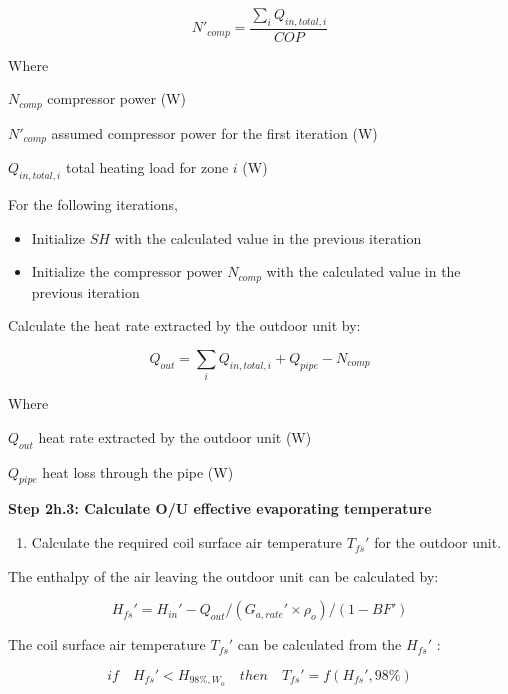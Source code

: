 \begin{equation}
N'_{comp} = \frac{\sum_iQ_{in,total,i}}{COP}
\end{equation}

Where

\(N_{comp}\) compressor power (W)

\(N'_{comp}\) assumed compressor power for the first iteration (W)

\(Q_{in,total,i}\) total heating load for zone \(i\) (W)

For the following iterations,

\begin{itemize}
\item
  Initialize \(SH\) with the calculated value in the previous iteration
\item
  Initialize the compressor power \(N_{comp}\) with the calculated value in the previous iteration
\end{itemize}

Calculate the heat rate extracted by the outdoor unit by:

\begin{equation}
Q_{out} = \sum_iQ_{in,total,i}+Q_{pipe}-N_{comp}
\end{equation}

Where

\(Q_{out}\) heat rate extracted by the outdoor unit (W)

\(Q_{pipe}\) heat loss through the pipe (W)

\textbf{Step 2h.3: Calculate O/U effective evaporating temperature} 

\begin{enumerate}
\def\labelenumi{(\arabic{enumi})}
\tightlist
\item
  Calculate the required coil surface air temperature \({T_{fs}}'\) for the outdoor unit.
\end{enumerate}

The enthalpy of the air leaving the outdoor unit can be calculated by:

\begin{equation}
{H_{fs}}' = {H_{in}}'-Q_{out}/({G_{a,rate}}'\times{\rho_o})/(1-BF')
\end{equation}

The coil surface air temperature \({T_{fs}}'\) can be calculated from the \({H_{fs}}'\) :

\begin{equation}
if\quad{H_{fs}}'<H_{98\%,W_o}\quad{then}\quad{T_{fs}}' = f({H_{fs}}',98\%)
\end{equation}

